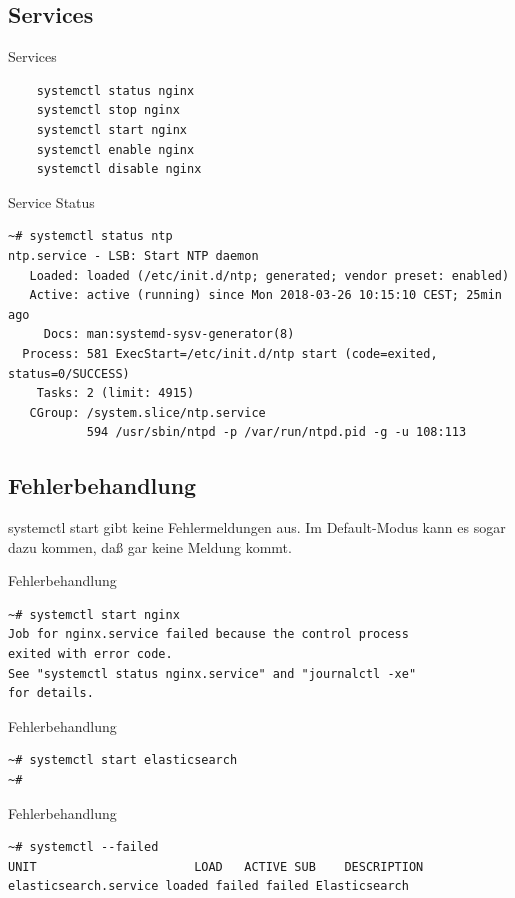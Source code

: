 \subsection{Services}

\begin{frame}[fragile]{Services}
 \begin{lstlisting}
    systemctl status nginx
    systemctl stop nginx
    systemctl start nginx
    systemctl enable nginx
    systemctl disable nginx
  \end{lstlisting}
\end{frame}

\begin{frame}[fragile]{Service Status}
\begin{lstlisting}
~# systemctl status ntp
ntp.service - LSB: Start NTP daemon
   Loaded: loaded (/etc/init.d/ntp; generated; vendor preset: enabled)
   Active: active (running) since Mon 2018-03-26 10:15:10 CEST; 25min ago
     Docs: man:systemd-sysv-generator(8)
  Process: 581 ExecStart=/etc/init.d/ntp start (code=exited, status=0/SUCCESS)
    Tasks: 2 (limit: 4915)
   CGroup: /system.slice/ntp.service
           594 /usr/sbin/ntpd -p /var/run/ntpd.pid -g -u 108:113
\end{lstlisting}
\end{frame}

\subsection{Fehlerbehandlung}

systemctl start gibt keine Fehlermeldungen aus. Im Default-Modus kann es sogar dazu kommen, daß gar keine Meldung kommt.

\begin{frame}[fragile]{Fehlerbehandlung}
\begin{lstlisting}
~# systemctl start nginx
Job for nginx.service failed because the control process
exited with error code.
See "systemctl status nginx.service" and "journalctl -xe" 
for details.
\end{lstlisting}
\end{frame}

\begin{frame}[fragile]{Fehlerbehandlung}
\begin{lstlisting}
~# systemctl start elasticsearch
~#
\end{lstlisting}
\end{frame}

\begin{frame}[fragile]{Fehlerbehandlung}
\begin{lstlisting}
~# systemctl --failed
UNIT                      LOAD   ACTIVE SUB    DESCRIPTION
elasticsearch.service loaded failed failed Elasticsearch
\end{lstlisting}
\end{frame}

